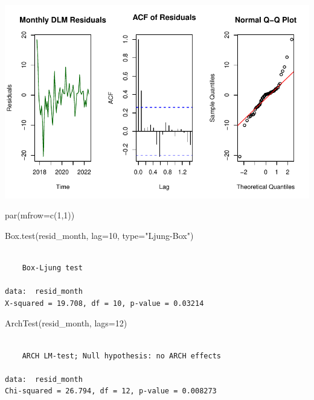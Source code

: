 \documentclass[
  11pt,
]{article}
\newenvironment{Shaded}{\begin{snugshade}}{\end{snugshade}}
\newcommand{\AttributeTok}[1]{\textcolor[rgb]{0.40,0.45,0.13}{#1}}
\newcommand{\DecValTok}[1]{\textcolor[rgb]{0.68,0.00,0.00}{#1}}
\newcommand{\FunctionTok}[1]{\textcolor[rgb]{0.28,0.35,0.67}{#1}}
\newcommand{\NormalTok}[1]{\textcolor[rgb]{0.00,0.23,0.31}{#1}}
\newcommand{\StringTok}[1]{\textcolor[rgb]{0.13,0.47,0.30}{#1}}
\begin{document}
\includegraphics{project_files/figure-pdf/unnamed-chunk-53-1.pdf}

\begin{Shaded}
\begin{Highlighting}[]
\FunctionTok{par}\NormalTok{(}\AttributeTok{mfrow=}\FunctionTok{c}\NormalTok{(}\DecValTok{1}\NormalTok{,}\DecValTok{1}\NormalTok{))}
\end{Highlighting}
\end{Shaded}

\begin{Shaded}
\begin{Highlighting}[]
\FunctionTok{Box.test}\NormalTok{(resid\_month, }\AttributeTok{lag=}\DecValTok{10}\NormalTok{, }\AttributeTok{type=}\StringTok{"Ljung{-}Box"}\NormalTok{)}
\end{Highlighting}
\end{Shaded}

\begin{verbatim}

    Box-Ljung test

data:  resid_month
X-squared = 19.708, df = 10, p-value = 0.03214
\end{verbatim}

\begin{Shaded}
\begin{Highlighting}[]
\FunctionTok{ArchTest}\NormalTok{(resid\_month, }\AttributeTok{lags=}\DecValTok{12}\NormalTok{)}
\end{Highlighting}
\end{Shaded}

\begin{verbatim}

    ARCH LM-test; Null hypothesis: no ARCH effects

data:  resid_month
Chi-squared = 26.794, df = 12, p-value = 0.008273
\end{verbatim}
\end{document}
